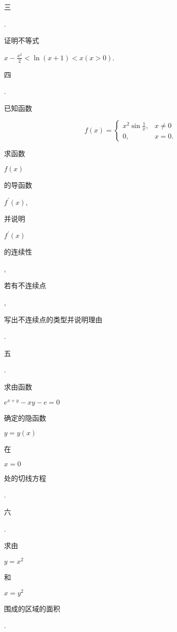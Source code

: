 \documentclass[10pt]{article}
\begin{document}
\begin{CJK}{UTF8}{mj}三\end{CJK}. \begin{CJK}{UTF8}{mj}证明不等式\end{CJK} $x-\frac{x^{2}}{2}<\ln (x+1)<x(x>0)$.

\begin{CJK}{UTF8}{mj}四\end{CJK}. \begin{CJK}{UTF8}{mj}已知函数\end{CJK}
$$
f(x)= \begin{cases}x^{2} \sin \frac{1}{x}, & x \neq 0 \\ 0, & x=0 .\end{cases}
$$
\begin{CJK}{UTF8}{mj}求函数\end{CJK} $f(x)$ \begin{CJK}{UTF8}{mj}的导函数\end{CJK} $f^{\prime}(x)$, \begin{CJK}{UTF8}{mj}并说明\end{CJK} $f^{\prime}(x)$ \begin{CJK}{UTF8}{mj}的连续性\end{CJK}, \begin{CJK}{UTF8}{mj}若有不连续点\end{CJK}, \begin{CJK}{UTF8}{mj}写出不连续点的类型并说明理由\end{CJK}.

\begin{CJK}{UTF8}{mj}五\end{CJK}. \begin{CJK}{UTF8}{mj}求由函数\end{CJK} $e^{x+y}-x y-e=0$ \begin{CJK}{UTF8}{mj}确定的隐函数\end{CJK} $y=y(x)$ \begin{CJK}{UTF8}{mj}在\end{CJK} $x=0$ \begin{CJK}{UTF8}{mj}处的切线方程\end{CJK}.

\begin{CJK}{UTF8}{mj}六\end{CJK}. \begin{CJK}{UTF8}{mj}求由\end{CJK} $y=x^{2}$ \begin{CJK}{UTF8}{mj}和\end{CJK} $x=y^{2}$ \begin{CJK}{UTF8}{mj}围成的区域的面积\end{CJK}.
\end{document}
